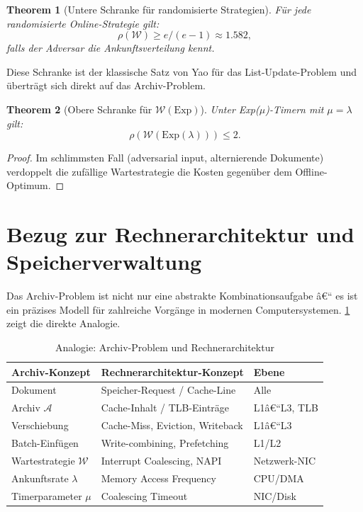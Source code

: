 ﻿\documentclass[12pt, a4paper]{article}
\newtheorem{theorem}{Theorem}[section]
\newcommand{\Exp}{\mathrm{Exp}}
\begin{document}
\begin{theorem}[Untere Schranke für randomisierte Strategien]\label{thm:lower}
Für jede randomisierte Online-Strategie gilt:
\[
  \rho(\mathcal{W}) \geq e/(e-1) \approx 1.582,
\]
falls der Adversar die Ankunftsverteilung kennt.
\end{theorem}

Diese Schranke ist der klassische Satz von Yao für das List-Update-Problem
und überträgt sich direkt auf das Archiv-Problem.

\begin{theorem}[Obere Schranke für $\mathcal{W}(\Exp)$]\label{thm:upper}
Unter Exp($\mu$)-Timern mit $\mu = \lambda$ gilt:
\[
  \rho(\mathcal{W}(\Exp(\lambda))) \leq 2.
\]
\end{theorem}

\begin{proof}
Im schlimmsten Fall (adversarial input, alternierende Dokumente) verdoppelt
die zufällige Wartestrategie die Kosten gegenüber dem Offline-Optimum.
\end{proof}

\section{Bezug zur Rechnerarchitektur und Speicherverwaltung}\label{sec:architecture}

Das Archiv-Problem ist nicht nur eine abstrakte Kombinationsaufgabe â€“ es
ist ein präzises Modell für zahlreiche Vorgänge in modernen Computersystemen.
\cref{tab:mapping} zeigt die direkte Analogie.

\begin{table}[ht]
\centering
\caption{Analogie: Archiv-Problem und Rechnerarchitektur}
\label{tab:mapping}
\renewcommand{\arraystretch}{1.4}
\begin{tabular}{lll}
\toprule
\textbf{Archiv-Konzept} & \textbf{Rechnerarchitektur-Konzept} & \textbf{Ebene}\\
\midrule
Dokument               & Speicher-Request / Cache-Line      & Alle\\
Archiv $\mathcal{A}$   & Cache-Inhalt / TLB-Einträge        & L1â€“L3, TLB\\
Verschiebung           & Cache-Miss, Eviction, Writeback    & L1â€“L3\\
Batch-Einfügen         & Write-combining, Prefetching       & L1/L2\\
Wartestrategie $\mathcal{W}$ & Interrupt Coalescing, NAPI      & Netzwerk-NIC\\
Ankunftsrate $\lambda$ & Memory Access Frequency            & CPU/DMA\\
Timerparameter $\mu$   & Coalescing Timeout                 & NIC/Disk\\
\bottomrule
\end{tabular}
\end{table}
\end{document}
